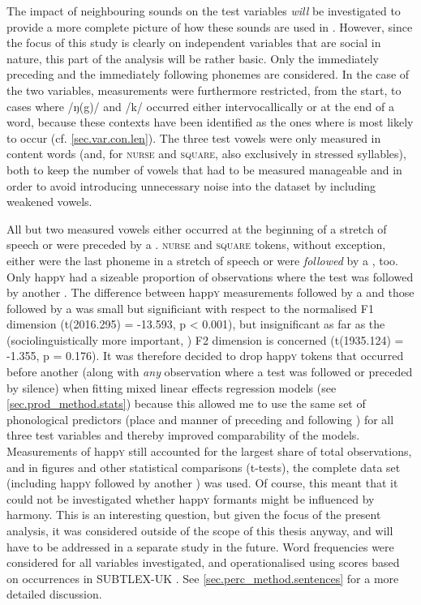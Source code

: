 The impact of neighbouring sounds on the test variables \emph{will} be investigated to provide a more complete picture of how these sounds are used in .
However, since the focus of this study is clearly on independent variables that are social in nature, this part of the analysis will be rather basic.
Only the immediately preceding and the immediately following phonemes are considered.
In the case of the two  variables, measurements were furthermore restricted, from the start, to cases where /ŋ(g)/ and /k/ occurred either intervocallically or at the end of a word, because these contexts have been identified as the ones where  is most likely to occur (cf. \ref{sec.var.con.len}).
The three test vowels were only measured in content words (and, for \textsc{nurse} and \textsc{square}, also exclusively in stressed syllables), both to keep the number of vowels that had to be measured manageable and in order to avoid introducing unnecessary noise into the dataset by including weakened vowels.

All but two measured vowels either occurred at the beginning of a stretch of speech or were preceded by a .
\textsc{nurse} and \textsc{square} tokens, without exception, either were the last phoneme in a stretch of speech or were \emph{followed} by a , too.
Only happ\textsc{y} had a sizeable proportion of observations where the test  was followed by another .
The difference between happ\textsc{y} measurements followed by a  and those followed by a  was small but significiant with respect to the normalised F1 dimension (t(2016.295) = -13.593, p < 0.001), but insignificant as far as the (sociolinguistically more important, \citealt[cf.][502]{labov2006a}) F2 dimension is concerned (t(1935.124) = -1.355, p = 0.176).
It was therefore decided to drop happ\textsc{y} tokens that occurred before another  (along with \emph{any} observation where a test  was followed or preceded by silence) when fitting mixed linear effects regression models (see \ref{sec.prod_method.stats}) because this allowed me to use the same set of phonological predictors (place and manner of preceding and following ) for all three  test variables and thereby improved comparability of the models.
Measurements of happ\textsc{y} still accounted for the largest share of total observations, and in figures and other statistical comparisons (t-tests), the complete data set (including happ\textsc{y} followed by another ) was used.
Of course, this meant that it could not be investigated whether happ\textsc{y} formants might be influenced by  harmony.
This is an interesting question, but given the focus of the present analysis, it was considered outside of the scope of this thesis anyway, and will have to be addressed in a separate study in the future.
Word frequencies were considered for all variables investigated, and operationalised using  scores based on occurrences in SUBTLEX-UK \parencite{heuvenetal2014}.
See \ref{sec.perc_method.sentences} for a more detailed discussion.

